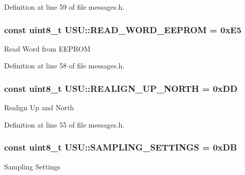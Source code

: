 \-Definition at line 59 of file messages.\-h.

\hypertarget{namespace_u_s_u_ac9d01a02c622d06449580697749db1f5}{
\subsubsection[{\-R\-E\-A\-D\-\_\-\-W\-O\-R\-D\-\_\-\-E\-E\-P\-R\-O\-M}]{\setlength{\rightskip}{0pt plus 5cm}const uint8\-\_\-t {\bf \-U\-S\-U\-::\-R\-E\-A\-D\-\_\-\-W\-O\-R\-D\-\_\-\-E\-E\-P\-R\-O\-M} = 0x\-E5}}\label{namespace_u_s_u_ac9d01a02c622d06449580697749db1f5}
\-Read \-Word from \-E\-E\-P\-R\-O\-M 

\-Definition at line 58 of file messages.\-h.

\hypertarget{namespace_u_s_u_a9c5f8777b9c35aaaa0b64490d1f9a20d}{
\subsubsection[{\-R\-E\-A\-L\-I\-G\-N\-\_\-\-U\-P\-\_\-\-N\-O\-R\-T\-H}]{\setlength{\rightskip}{0pt plus 5cm}const uint8\-\_\-t {\bf \-U\-S\-U\-::\-R\-E\-A\-L\-I\-G\-N\-\_\-\-U\-P\-\_\-\-N\-O\-R\-T\-H} = 0x\-D\-D}}\label{namespace_u_s_u_a9c5f8777b9c35aaaa0b64490d1f9a20d}
\-Realign \-Up and \-North 

\-Definition at line 55 of file messages.\-h.

\hypertarget{namespace_u_s_u_aeb8ec20b4bb74ff2895ab487c29810e0}{
\subsubsection[{\-S\-A\-M\-P\-L\-I\-N\-G\-\_\-\-S\-E\-T\-T\-I\-N\-G\-S}]{\setlength{\rightskip}{0pt plus 5cm}const uint8\-\_\-t {\bf \-U\-S\-U\-::\-S\-A\-M\-P\-L\-I\-N\-G\-\_\-\-S\-E\-T\-T\-I\-N\-G\-S} = 0x\-D\-B}}\label{namespace_u_s_u_aeb8ec20b4bb74ff2895ab487c29810e0}
\-Sampling \-Settings 

